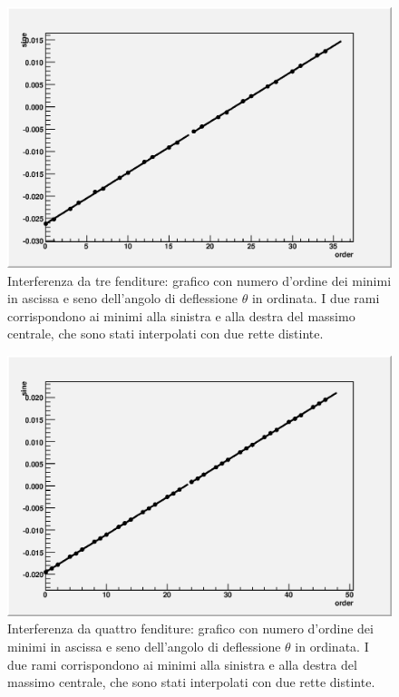 \documentclass[italian,a4paper]{article}
\begin{document}
\begin{figure}[ph]\centering
\includegraphics[scale=.6]{3slits.outsin.eps}
\caption{Interferenza da tre fenditure: grafico con numero d'ordine dei minimi in ascissa e seno dell'angolo di deflessione $\theta$ in ordinata. I due rami corrispondono ai minimi alla sinistra e alla destra del massimo centrale, che sono stati interpolati con due rette distinte.}\label{3slitssin}
\end{figure}
\begin{figure}[ph]\centering
\includegraphics[scale=.6]{4slits.outsin.eps}
\caption{Interferenza da quattro fenditure: grafico con numero d'ordine dei minimi in ascissa e seno dell'angolo di deflessione $\theta$ in ordinata. I due rami corrispondono ai minimi alla sinistra e alla destra del massimo centrale, che sono stati interpolati con due rette distinte.}\label{4slitssin}
\end{figure}
\end{document}
